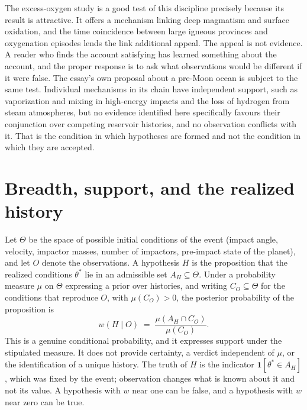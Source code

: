 \documentclass[11pt]{article}
\begin{document}
The excess-oxygen study is a good test of this discipline precisely because its result is attractive. It offers a mechanism linking deep magmatism and surface oxidation, and the time coincidence between large igneous provinces and oxygenation episodes lends the link additional appeal. The appeal is not evidence. A reader who finds the account satisfying has learned something about the account, and the proper response is to ask what observations would be different if it were false. The essay's own proposal about a pre-Moon ocean is subject to the same test. Individual mechanisms in its chain have independent support, such as vaporization and mixing in high-energy impacts and the loss of hydrogen from steam atmospheres, but no evidence identified here specifically favours their conjunction over competing reservoir histories, and no observation conflicts with it. That is the condition in which hypotheses are formed and not the condition in which they are accepted.

\appendix

\section{Breadth, support, and the realized history}

Let $\Theta$ be the space of possible initial conditions of the event (impact angle, velocity, impactor masses, number of impactors, pre-impact state of the planet), and let $O$ denote the observations. A hypothesis $H$ is the proposition that the realized conditions $\theta^\ast$ lie in an admissible set $A_H \subseteq \Theta$. Under a probability measure $\mu$ on $\Theta$ expressing a prior over histories, and writing $C_O \subseteq \Theta$ for the conditions that reproduce $O$, with $\mu(C_O) > 0$, the posterior probability of the proposition is
\[
w(H \mid O) \;=\; \frac{\mu(A_H \cap C_O)}{\mu(C_O)} .
\]
This is a genuine conditional probability, and it expresses support under the stipulated measure. It does not provide certainty, a verdict independent of $\mu$, or the identification of a unique history. The truth of $H$ is the indicator $\mathbf{1}[\theta^\ast \in A_H]$, which was fixed by the event; observation changes what is known about it and not its value. A hypothesis with $w$ near one can be false, and a hypothesis with $w$ near zero can be true.
\end{document}
